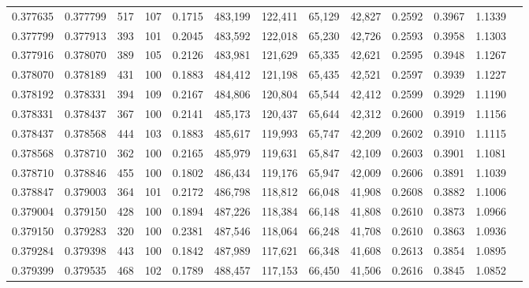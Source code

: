 \begin{tabular}{rrrrrrrrrrrrr}
0.377635 & 0.377799 &   517 & 107 &                                     0.1715 & 483,199 & 122,411 &  65,129 &  42,827 & 0.2592 & 0.3967 & 1.1339 \\
0.377799 & 0.377913 &   393 & 101 &                                     0.2045 & 483,592 & 122,018 &  65,230 &  42,726 & 0.2593 & 0.3958 & 1.1303 \\
0.377916 & 0.378070 &   389 & 105 &                                     0.2126 & 483,981 & 121,629 &  65,335 &  42,621 & 0.2595 & 0.3948 & 1.1267 \\
0.378070 & 0.378189 &   431 & 100 &                                     0.1883 & 484,412 & 121,198 &  65,435 &  42,521 & 0.2597 & 0.3939 & 1.1227 \\
0.378192 & 0.378331 &   394 & 109 &                                     0.2167 & 484,806 & 120,804 &  65,544 &  42,412 & 0.2599 & 0.3929 & 1.1190 \\
0.378331 & 0.378437 &   367 & 100 &                                     0.2141 & 485,173 & 120,437 &  65,644 &  42,312 & 0.2600 & 0.3919 & 1.1156 \\
0.378437 & 0.378568 &   444 & 103 &                                     0.1883 & 485,617 & 119,993 &  65,747 &  42,209 & 0.2602 & 0.3910 & 1.1115 \\
0.378568 & 0.378710 &   362 & 100 &                                     0.2165 & 485,979 & 119,631 &  65,847 &  42,109 & 0.2603 & 0.3901 & 1.1081 \\
0.378710 & 0.378846 &   455 & 100 &                                     0.1802 & 486,434 & 119,176 &  65,947 &  42,009 & 0.2606 & 0.3891 & 1.1039 \\
0.378847 & 0.379003 &   364 & 101 &                                     0.2172 & 486,798 & 118,812 &  66,048 &  41,908 & 0.2608 & 0.3882 & 1.1006 \\
0.379004 & 0.379150 &   428 & 100 &                                     0.1894 & 487,226 & 118,384 &  66,148 &  41,808 & 0.2610 & 0.3873 & 1.0966 \\
0.379150 & 0.379283 &   320 & 100 &                                     0.2381 & 487,546 & 118,064 &  66,248 &  41,708 & 0.2610 & 0.3863 & 1.0936 \\
0.379284 & 0.379398 &   443 & 100 &                                     0.1842 & 487,989 & 117,621 &  66,348 &  41,608 & 0.2613 & 0.3854 & 1.0895 \\
0.379399 & 0.379535 &   468 & 102 &                                     0.1789 & 488,457 & 117,153 &  66,450 &  41,506 & 0.2616 & 0.3845 & 1.0852 \\

\end{tabular}
